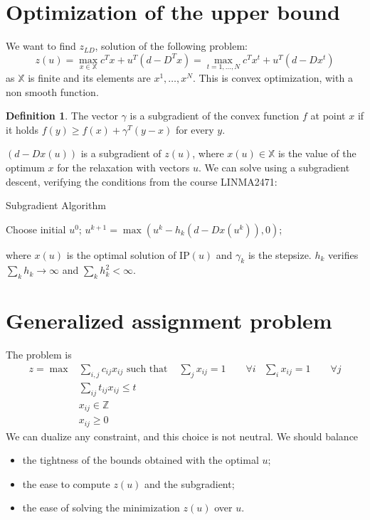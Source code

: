\documentclass[11pt, openany]{report}
\theoremstyle{definition}
\newtheorem{definition}[thm]{Definition}
\begin{document}
\section{Optimization of the upper bound}
We want to find $z_{LD}$, solution of the following problem:
\begin{equation}
    z(u) = \max_{x\in \mathbb{X}} c^Tx + u^T(d-D^Tx) = \max_{t=1,\dots,N} c^Tx^t + u^T (d-Dx^t)
\end{equation}
as $\mathbb{X}$ is finite and its elements are $x^1,\dots, x^N$. This is convex optimization, with a non smooth function. 
\begin{definition}
    The vector $\gamma$ is a subgradient of the convex function $f$ at point $x$ if it holds $f(y) \ge f(x)+\gamma^T(y-x)$ for every $y$. 
\end{definition}
$(d-Dx(u))$ is a subgradient of $z(u)$, where $x(u)\in \mathbb{X}$ is the value of the optimum $x$ for the relaxation with vectors $u$. We can solve using a subgradient descent, verifying the conditions from the course LINMA2471:
\begin{algorithm}[H]
    \caption{Subgradient Algorithm}\label{algo:subgradient}
    \begin{algorithmic}[1]
        \State Choose initial $u^0$;
        \State $u^{k+1} = \max (u^k - h_k (d-Dx(u^k)),0)$;
        \EndFor
    \end{algorithmic}
\end{algorithm}
where $x(u)$ is the optimal solution of IP$(u)$ and $\gamma_k$ is the stepsize. $h_k$ verifies $\sum_k h_k \rightarrow \infty$ and $\sum_k h_k^2 < \infty $.
\section{Generalized assignment problem}
The problem is 
\begin{equation}
    \begin{aligned}
        z = \max &\sum_{i,j}c_{ij}x_{ij} 
        \text{ such that } &\sum_j x_{ij} = 1\qquad \forall i
        & \sum_i x_{ij} = 1\qquad \forall j\\
        &\sum_{ij}t_{ij}x_{ij} \le t\\
        &x_{ij}\in \mathbb{Z}\\
        &x_{ij}\ge 0
    \end{aligned}
\end{equation}
We can dualize any constraint, and this choice is not neutral. We should balance 
\begin{itemize}
    \item the tightness of the bounds obtained with the optimal $u$;
    \item the ease to compute $z(u)$ and the subgradient;
    \item the ease of solving the minimization $z(u)$ over $u$.
\end{itemize}
\end{document}
